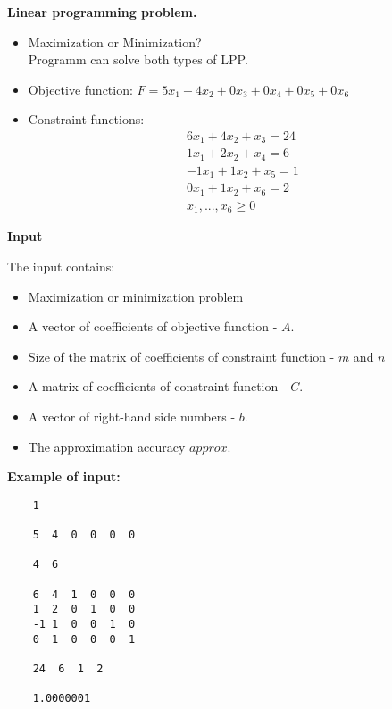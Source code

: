 \documentclass[12pt, legalpaper]{exam}
\begin{document}
\noindent  \textbf{Linear programming problem.}
\begin{itemize}
\item Maximization or Minimization?
\\
Programm can solve both types of LPP. 
\vspace{10pt}
    \item Objective function: $F = 5x_1 + 4x_2 + 0x_3 + 0x_4 + 0x_5 + 0x_6$
    \vspace{10pt}
    \item Constraint functions:
    \begin{gather*}
        6x_1 + 4x_2 + x_3 = 24 \\
        1x_1 + 2x_2 + x_4 = 6  \\
        -1x_1 + 1x_2 + x_5 = 1 \\
        0x_1 + 1x_2 + x_6 = 2  \\
        x_1,...,x_6 \geq 0
    \end{gather*}

\end{itemize}



\noindent     \textbf{Input}

\vspace{12pt}
The input contains:
\begin{itemize}
    \item Maximization or minimization problem
    \item A vector of coefficients of objective function - $A$.
    \item Size of the matrix of coefficients of constraint function - $m$ and $n$
    \item A matrix of coefficients of constraint function - $C$.
    \item A vector of right-hand side numbers - $b$.
    \item The approximation accuracy $approx$.
\end{itemize}

\vspace{12pt}
\textbf{Example of input:}
\begin{verbatim}
    1 
    
    5  4  0  0  0  0

    4  6

    6  4  1  0  0  0 
    1  2  0  1  0  0
    -1 1  0  0  1  0
    0  1  0  0  0  1

    24  6  1  2

    1.0000001
\end{verbatim}
\end{document}
